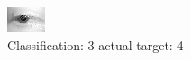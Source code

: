\begin{figure}[h!]
\begin{center}
\includegraphics[width=0.60\columnwidth]{figures/ID2590_class_3_target_4.png}
\end{center}
\caption{ Classification: 3 actual target: 4}
\label{fig:ID2590_class_3_target_4}
\end{figure}
